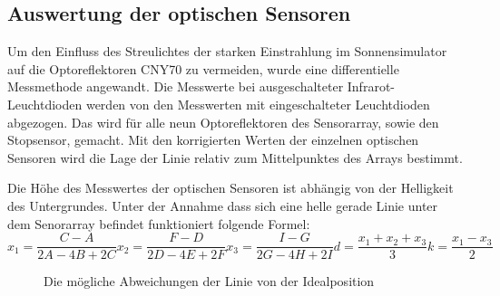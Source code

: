 \documentclass[a4paper,bibtotoc,oneside]{scrbook}
\begin{document}
\subsection{Auswertung der optischen Sensoren}\thispagestyle{empty}
Um den Einfluss des Streulichtes der starken Einstrahlung im Sonnensimulator auf die Optoreflektoren CNY70 zu vermeiden, wurde eine differentielle Messmethode angewandt. Die Messwerte bei ausgeschalteter Infrarot-Leuchtdioden werden von den Messwerten mit eingeschalteter Leuchtdioden abgezogen.
Das wird für alle neun Optoreflektoren des Sensorarray, sowie den Stopsensor, gemacht.
Mit den korrigierten Werten der einzelnen optischen Sensoren wird die Lage der Linie relativ zum Mittelpunktes des Arrays bestimmt. 

Die Höhe des Messwertes  der optischen Sensoren ist abhängig von der Helligkeit des Untergrundes. Unter der Annahme dass sich eine helle gerade Linie unter dem Senorarray befindet funktioniert folgende Formel:
\begin{equation}
  x_1 = \frac{C-A}{2A-4B+2C}
  x_2 = \frac{F-D}{2D-4E+2F}
  x_3 = \frac{I-G}{2G-4H+2I}
  d = \frac{x_1+x_2+x_3}{3}
  k = \frac{x_1-x_3}{2}
\end{equation}


\begin{figure}
\centering
\caption{Die mögliche Abweichungen der Linie von der Idealposition}
\end{figure} 
\end{document}

